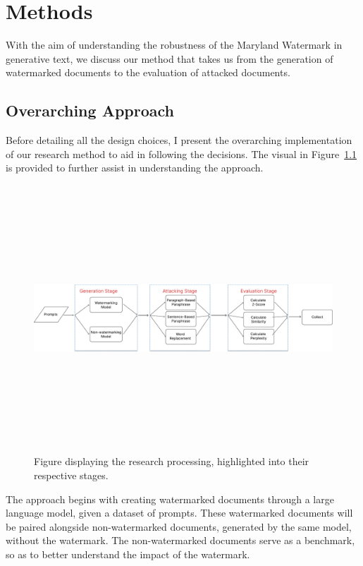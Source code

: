 \documentclass{l4proj}
\theoremstyle{definition}
\begin{document}
    
\chapter{Methods}
\label{chap:method}

With the aim of understanding the robustness of the Maryland Watermark in generative text, we discuss our method that takes us from the generation of watermarked documents to the evaluation of attacked documents.

\section{Overarching Approach}
    Before detailing all the design choices, I present the overarching implementation of our research method to aid in following the decisions. The visual in Figure~\ref{fig:method-flow-chart} is provided to further assist in understanding the approach.

    \begin{figure}[ht]
        \centering
         \includegraphics[height=10cm, width=1\linewidth, keepaspectratio]{images/methods/research-process.pdf}
        \caption{Figure displaying the research processing, highlighted into their respective stages.}
        \label{fig:method-flow-chart} 
    \end{figure}
    
    The approach begins with creating watermarked documents through a large language model, given a dataset of prompts. These watermarked documents will be paired alongside non-watermarked documents, generated by the same model, without the watermark. The non-watermarked documents serve as a benchmark, so as to better understand the impact of the watermark.
\end{document}
